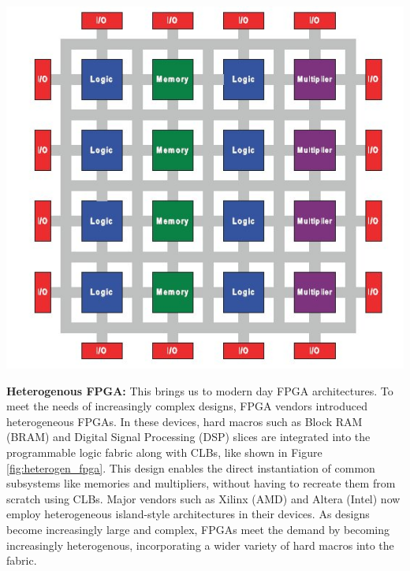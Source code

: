 {
    \centering
    \includegraphics[width=\columnwidth]{figures/heterogenous_fpga_3.jpg}
    \label{fig:heterogen_fpga}
}
\vspace{0.25cm}

\textbf{Heterogenous FPGA:} \quad 
This brings us to modern day FPGA architectures. 
To meet the needs of increasingly complex designs, FPGA vendors introduced heterogeneous FPGAs. 
In these devices, hard macros such as Block RAM (BRAM) and Digital Signal Processing (DSP) slices are integrated into the programmable logic fabric along with CLBs, like shown in Figure \ref{fig:heterogen_fpga}. 
This design enables the direct instantiation of common subsystems like memories and multipliers, without having to recreate them from scratch using CLBs. 
Major vendors such as Xilinx (AMD) and Altera (Intel) now employ heterogeneous island-style architectures in their devices. 
As designs become increasingly large and complex, FPGAs meet the demand by becoming increasingly heterogenous, incorporating a wider variety of hard macros into the fabric. 

